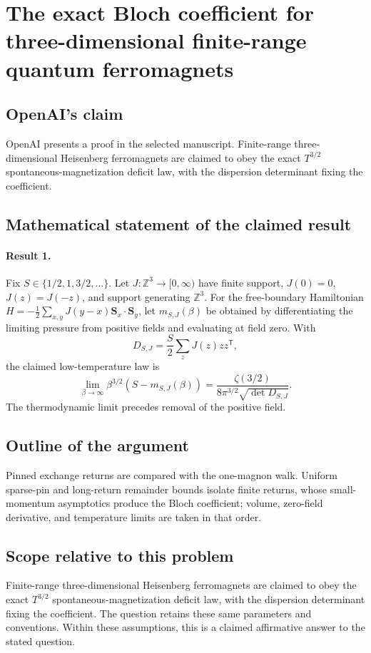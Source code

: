\documentclass[11pt]{article}
\begin{document}
\section*{The exact Bloch coefficient for three-dimensional finite-range quantum ferromagnets}

\subsection{OpenAI's claim}
OpenAI presents a proof in the selected manuscript. Finite-range three-dimensional Heisenberg ferromagnets are claimed to obey the exact $T^{3/2}$ spontaneous-magnetization deficit law, with the dispersion determinant fixing the coefficient.

\subsection{Mathematical statement of the claimed result}
\paragraph{Result 1.} Fix \(S\in\{1/2,1,3/2,\ldots\}\). Let \(J:\mathbb Z^3\to[0,\infty)\) have finite support, \(J(0)=0\), \(J(z)=J(-z)\), and support generating \(\mathbb Z^3\). For the free-boundary Hamiltonian \(H=-\tfrac12\sum_{x,y}J(y-x)\boldsymbol S_x\cdot\boldsymbol S_y\), let \(m_{S,J}(\beta)\) be obtained by differentiating the limiting pressure from positive fields and evaluating at field zero. With
\[
 D_{S,J}=\frac S2\sum_zJ(z)zz^{\mathsf T},
\]
the claimed low-temperature law is
\[
 \lim_{\beta\to\infty}\beta^{3/2}(S-m_{S,J}(\beta))
 =\frac{\zeta(3/2)}{8\pi^{3/2}\sqrt{\det D_{S,J}}}.
\]
The thermodynamic limit precedes removal of the positive field.

\subsection{Outline of the argument}
Pinned exchange returns are compared with the one-magnon walk. Uniform sparse-pin and long-return remainder bounds isolate finite returns, whose small-momentum asymptotics produce the Bloch coefficient; volume, zero-field derivative, and temperature limits are taken in that order.

\subsection{Scope relative to this problem}
Finite-range three-dimensional Heisenberg ferromagnets are claimed to obey the exact $T^{3/2}$ spontaneous-magnetization deficit law, with the dispersion determinant fixing the coefficient. The question retains these same parameters and conventions. Within these assumptions, this is a claimed affirmative answer to the stated question.
\end{document}
